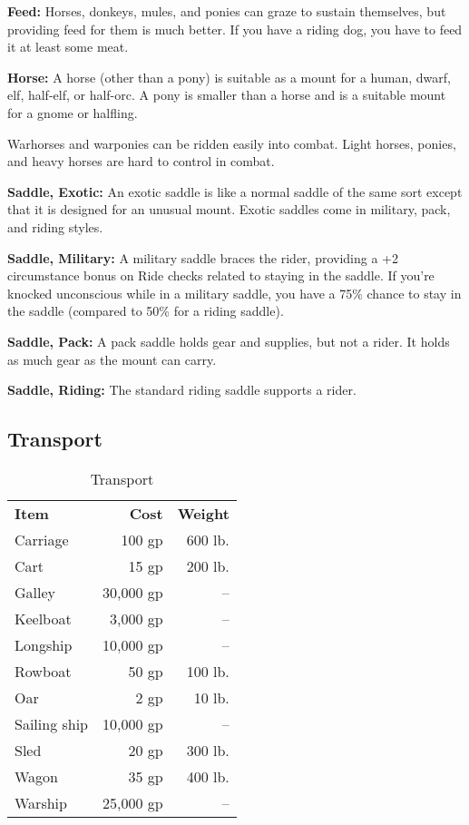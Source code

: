 \textbf{Feed:} Horses, donkeys, mules, and ponies can graze to sustain themselves, 
but providing feed for them is much better. If you have a riding dog, you have 
to feed it at least some meat.

\textbf{Horse:} A horse (other than a pony) is suitable as a mount for a human, 
dwarf, elf, half-elf, or half-orc. A pony is smaller than a horse and is a suitable 
mount for a gnome or halfling.

Warhorses and warponies can be ridden easily into combat. Light horses, ponies, 
and heavy horses are hard to control in combat.

\textbf{Saddle, Exotic:} An exotic saddle is like a normal saddle of the same sort 
except that it is designed for an unusual mount. Exotic saddles come in military, 
pack, and riding styles.

\textbf{Saddle, Military:} A military saddle braces the rider, providing a +2 circumstance 
bonus on Ride checks related to staying in the saddle. If you're knocked unconscious 
while in a military saddle, you have a 75\% chance to stay in the saddle (compared 
to 50\% for a riding saddle).

\textbf{Saddle, Pack:} A pack saddle holds gear and supplies, but not a rider. 
It holds as much gear as the mount can carry.

\textbf{Saddle, Riding:} The standard riding saddle supports a rider.

\subsection{Transport}

\begin{table}[htb]
\caption{Transport}
\centering
\begin{tabular}{l r r}
\textbf{Item} & \textbf{Cost} & \textbf{Weight}\\
Carriage & 100 gp & 600 lb.\\
Cart & 15 gp & 200 lb.\\
Galley & 30,000 gp & --\\
Keelboat & 3,000 gp & --\\
Longship & 10,000 gp & --\\
Rowboat & 50 gp & 100 lb.\\
Oar & 2 gp & 10 lb.\\
Sailing ship & 10,000 gp & --\\
Sled & 20 gp & 300 lb.\\
Wagon & 35 gp & 400 lb.\\
Warship & 25,000 gp & --\\
\end{tabular}
\end{table}

